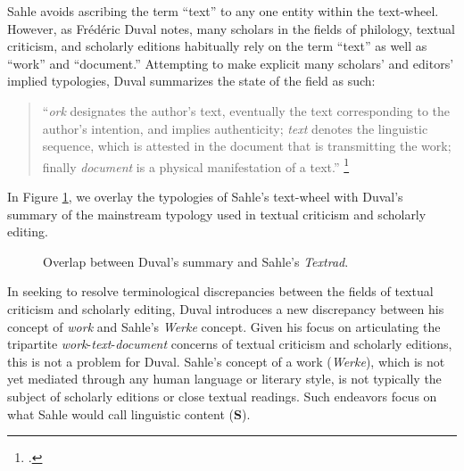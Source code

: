 Sahle avoids ascribing the term ``text'' to any one entity within the text-wheel. However, as Frédéric Duval notes, many scholars in the fields of philology, textual criticism, and scholarly editions habitually rely on the term ``text'' as well as ``work'' and ``document.'' Attempting to make explicit many scholars' and editors' implied typologies, Duval summarizes the state of the field as such:
\begin{quote}
    ``\textit{ork} designates the author's text, eventually the text corresponding to the author's intention, and implies authenticity; \textit{text} denotes the linguistic sequence, which is attested in the document that is transmitting the work; finally \textit{document} is a physical manifestation of a text.''
    \footcite[``\textit{work} désigne le texte de l'auteur, éventuellement le texte correspondant à la volonté de l'auteur, et implique la notion d'authenticité ; \textit{text} dénomme la séquence linguistique attestée dans un document transmettant l'œuvre ; enfin \textit{document} est une manifestation physique d'un text''][16]{Duval2017}
\end{quote}

\noindent In Figure \ref{fig:DuvalTypes}, we overlay the typologies of Sahle's text-wheel with Duval's summary of the mainstream typology used in textual criticism and scholarly editing.

\begin{figure}[ht]

\caption{Overlap between Duval's summary and Sahle's \textit{Textrad}.}
\label{fig:DuvalTypes}
\end{figure}

In seeking to resolve terminological discrepancies between the fields of textual criticism and scholarly editing, Duval introduces a new discrepancy between his concept of \textit{work} and Sahle's \textit{Werke} concept. Given his focus on articulating the tripartite \textit{work}-\textit{text}-\textit{document} concerns of textual criticism and scholarly editions, this is not a problem for Duval. Sahle's concept of a work (\textit{Werke}), which is not yet mediated through any human language or literary style, is not typically the subject of scholarly editions or close textual readings. Such endeavors focus on what Sahle would call linguistic content (\textbf{S}).